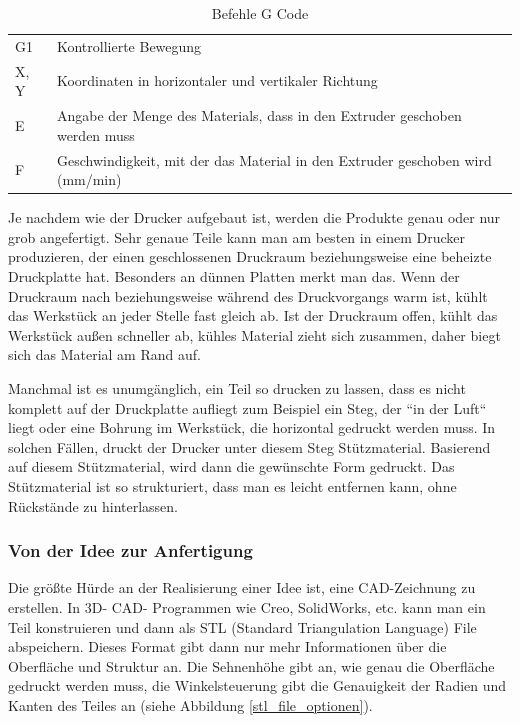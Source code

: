 			\begin{table}[htbp]
  		\centering
  		\caption{Befehle G Code}
	    \begin{tabular}{ll}
	    G1    & Kontrollierte Bewegung \\
	    X, Y  & Koordinaten in horizontaler und vertikaler Richtung \\
	    E     & Angabe der Menge des Materials, dass in den Extruder geschoben werden muss \\
	    F     & Geschwindigkeit, mit der das Material in den Extruder geschoben wird (mm/min) \\
	    \end{tabular}%
	  	\label{tab:befehle gcode}%
			\end{table}%

		Je nachdem wie der Drucker aufgebaut ist, werden die Produkte genau oder nur grob angefertigt.
		Sehr genaue Teile kann man am besten in einem Drucker produzieren, der einen geschlossenen Druckraum beziehungsweise eine beheizte Druckplatte hat.
		Besonders an dünnen Platten merkt man das.
		Wenn der Druckraum nach beziehungsweise während des Druckvorgangs warm ist, kühlt das Werkstück an jeder Stelle fast gleich ab.
		Ist der Druckraum offen, kühlt das Werkstück außen schneller ab, kühles Material zieht sich zusammen, daher biegt sich das Material am Rand auf.

		Manchmal ist es unumgänglich, ein Teil so drucken zu lassen, dass es nicht komplett auf der Druckplatte aufliegt zum Beispiel ein Steg,
		der “in der Luft“ liegt oder eine Bohrung im Werkstück, die horizontal gedruckt werden muss.
		In solchen Fällen, druckt der Drucker unter diesem Steg Stützmaterial. Basierend auf diesem Stützmaterial, wird dann die gewünschte Form gedruckt.
		Das Stützmaterial ist so strukturiert, dass man es leicht entfernen kann, ohne Rückstände zu hinterlassen.

		\subsubsection{Von der Idee zur Anfertigung}

		Die größte Hürde an der Realisierung einer Idee ist, eine CAD-Zeichnung zu erstellen. In 3D- CAD- Programmen wie Creo, SolidWorks, etc. kann man ein Teil konstruieren und dann als STL (Standard Triangulation Language) File abspeichern.
		Dieses Format gibt dann nur mehr Informationen über die Oberfläche und Struktur an.
		Die Sehnenhöhe gibt an, wie genau die Oberfläche gedruckt werden muss, die Winkelsteuerung gibt die Genauigkeit der Radien und Kanten des Teiles an (siehe Abbildung \ref{stl_file_optionen}).


